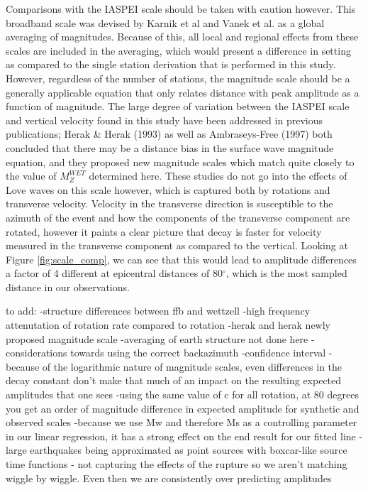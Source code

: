 \documentclass{gji}
\begin{document}
Comparisons with the IASPEI scale should be taken with caution however. This broadband scale was devised by Karnik et al and Vanek et al. as a global averaging of magnitudes. Because of this, all local and regional effects from these scales are included in the averaging, which would present a difference in setting as compared to the single station derivation that is performed in this study. However, regardless of the number of stations, the magnitude scale should be a generally applicable equation that only relates distance with peak amplitude as a function of magnitude. The large degree of variation between the IASPEI scale and vertical velocity found in this study have been addressed in previous publications; Herak \& Herak (1993) as well as Ambraseys-Free (1997) %
both concluded that there may be a distance bias in the surface wave magnitude equation, and they proposed new magnitude scales which match quite closely to the value of $M^{WET}_Z$ determined here. These studies do not go into the effects of Love waves on this scale however, which is captured both by rotations and transverse velocity. Velocity in the transverse direction is susceptible to the azimuth of the event and how the components of the transverse component are rotated, however it paints a clear picture that decay is faster for velocity measured in the transverse component as compared to the vertical. Looking at Figure \ref{fig:scale_comp}, we can see that this would lead to amplitude differences a factor of 4 different at epicentral distances of 80$^\circ$, which is the most sampled distance in our observations.


to add: 
-structure differences between ffb and wettzell
-high frequency attenutation of rotation rate compared to rotation
-herak and herak newly proposed magnitude scale
-averaging of earth structure not done here
-considerations towards using the correct backazimuth
-confidence interval
-because of the logarithmic nature of magnitude scales, even differences in the decay constant don't make that much of an impact on the resulting expected amplitudes that one sees 
-using the same value of c for all rotation, at 80 degrees you get an order of magnitude difference in expected amplitude for synthetic and observed scales
-because we use Mw and therefore Ms as a controlling parameter in our linear regression, it has a strong effect on the end result for our fitted line
-large earthquakes being approximated as point sources with boxcar-like source time functions - not capturing the effects of the rupture so we aren't matching wiggle by wiggle. Even then we are consistently over predicting amplitudes 
\end{document}
